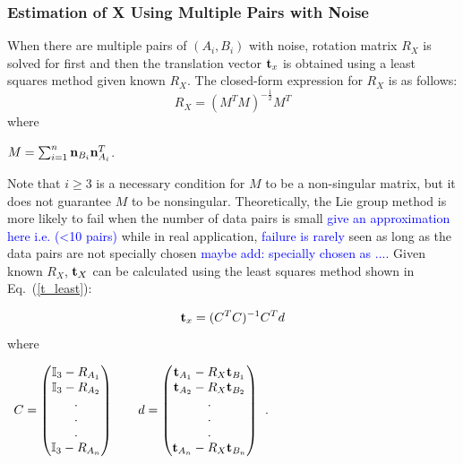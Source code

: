 \documentclass[twocolumn,10pt]{asme2ej}
\newcommand{\nn}{{\bf n}}
\newcommand{\ttt}{{\bf t}}
\begin{document}
\subsubsection{Estimation of X Using Multiple Pairs with Noise}
When there are multiple pairs of $(A_{i}, B_{i})$ with noise, rotation matrix $R_{X}$ is solved for first and then the translation vector $\ttt_{x}$ is obtained using a least squares method given known $R_{X}$. The closed-form expression for $R_{X}$ is as follows:
\begin{equation}
R_{X} = (M^{T}M)^{-\frac{1}{2}}M^{T}
\end{equation}
where \\
\begin{center}
$M = \sum_{i=1}^{n}{\nn_{B_{i}} \nn_{A_{i}}^{T}}$.
\end{center}
Note that $i \geq 3$ is a necessary condition for $M$ to be a non-singular matrix, but it does not guarantee $M$ to be nonsingular. Theoretically, the Lie group method is more likely to fail when the number of data pairs is small \textcolor{blue}{give an approximation here i.e. (<10 pairs)} while in real application, \textcolor{blue}{failure is rarely} %
seen as long as the data pairs are not specially chosen \textcolor{blue}{maybe add: specially chosen as ...}. Given known $R_{X}$, $\ttt_{X}$ can be calculated using the least squares method shown in Eq.~(\ref{t_least}):

\begin{equation}
\ttt_{x} = (C^{T}C)^{-1}C^{T}d
\label{t_least}
\end{equation}
where\\

\begin{center}
$\begin{array}{lr}
C = \begin{pmatrix}
\mathbb{I}_{3} - R_{{A_{1}}}\\
\mathbb{I}_{3} - R_{{A_{2}}}\\
.\\
.\\
.\\
\mathbb{I}_{3} - R_{{A_{n}}}\\
\end{pmatrix}
\; \; 
& \; \;
d = \begin{pmatrix}
\ttt_{A_{1}} - R_{X}\ttt_{B_{1}}\\
\ttt_{A_{2}} - R_{X}\ttt_{B_{2}}\\.\\
.\\
.\\
\ttt_{A_{n}} - R_{X}\ttt_{B_{n}}\\\end{pmatrix} 
\end{array}$.
\end{center}
\end{document}

